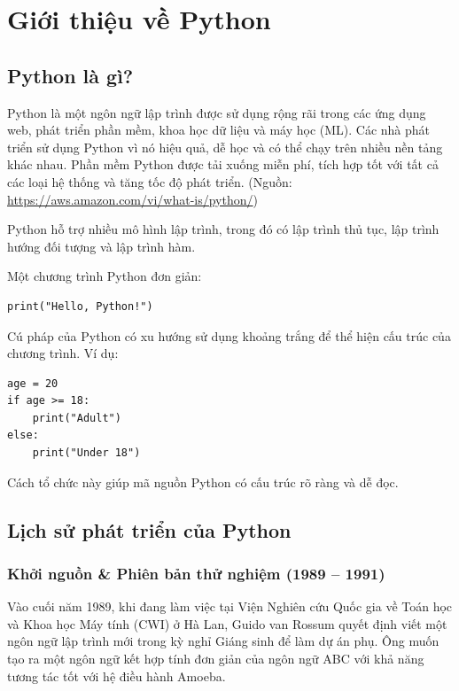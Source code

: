 \chapter{Giới thiệu về Python}
\label{chap:intro}

\section{Python là gì?}

Python là một ngôn ngữ lập trình được sử dụng rộng rãi trong các ứng dụng web, phát triển phần mềm, khoa học dữ liệu và máy học (ML). Các nhà phát triển sử dụng Python vì nó hiệu quả, dễ học và có thể chạy trên nhiều nền tảng khác nhau. Phần mềm Python được tải xuống miễn phí, tích hợp tốt với tất cả các loại hệ thống và tăng tốc độ phát triển. (Nguồn: \url{https://aws.amazon.com/vi/what-is/python/})

Python hỗ trợ nhiều mô hình lập trình, trong đó có lập trình thủ tục, lập trình hướng đối tượng và lập trình hàm. 

Một chương trình Python đơn giản:

\begin{lstlisting}
print("Hello, Python!")
\end{lstlisting}

Cú pháp của Python có xu hướng sử dụng khoảng trắng để thể hiện cấu trúc của chương trình. Ví dụ:

\begin{lstlisting}
age = 20
if age >= 18:
    print("Adult")
else:
    print("Under 18")
\end{lstlisting}

Cách tổ chức này giúp mã nguồn Python có cấu trúc rõ ràng và dễ đọc.

\section{Lịch sử phát triển của Python}

\subsection{Khởi nguồn \& Phiên bản thử nghiệm (1989 – 1991)}
Vào cuối năm 1989, khi đang làm việc tại Viện Nghiên cứu Quốc gia về Toán học và Khoa học Máy tính (CWI) ở Hà Lan, Guido van Rossum quyết định viết một ngôn ngữ lập trình mới trong kỳ nghỉ Giáng sinh để làm dự án phụ. Ông muốn tạo ra một ngôn ngữ kết hợp tính đơn giản của ngôn ngữ ABC với khả năng tương tác tốt với hệ điều hành Amoeba.

